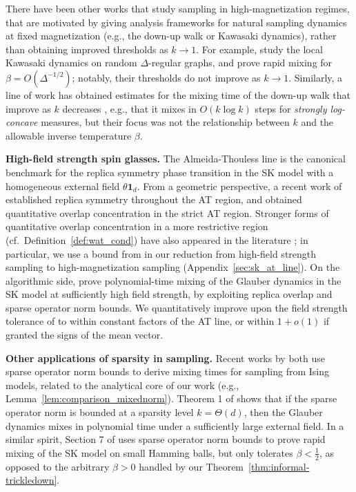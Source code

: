 \documentclass[11pt]{article}
\newcommand{\half}{\frac{1}{2}}
\newcommand{\1}{\mathbf{1}}
\newcommand{\0}{\mathbf{0}}
\begin{document}
There have been other works that study sampling in high-magnetization regimes, that are motivated by giving analysis frameworks for natural sampling dynamics at fixed magnetization (e.g., the down-up walk or Kawasaki dynamics), rather than obtaining improved thresholds as $k \to 1$. For example, \cite{BauerschmidtBodineauDagallier2024} study the local Kawasaki dynamics on random $\Delta$-regular graphs, and prove rapid mixing for $\beta = O(\Delta^{-1/2})$; notably, their thresholds do not improve as $k \to 1$. Similarly, a line of work has obtained estimates for the mixing time of the down-up walk that improve as $k$ decreases \cite{AnariLGV19, CryanGM19, AnariKV24}, e.g., that it mixes in $O(k\log k)$ steps for \emph{strongly log-concave} measures, but their focus was not the relationship between $k$ and the allowable inverse temperature $\beta$.

\textbf{High-field strength spin glasses.} The Almeida-Thouless line \cite{deAlmeidaThouless78} is the canonical benchmark for the replica symmetry phase transition in the SK model with a homogeneous external field $\theta\1_d$. From a geometric perspective, a recent work of \cite{Lopatto26} established replica symmetry throughout the AT region, and \cite{kusuoka2026quantitative} obtained quantitative overlap concentration in the strict AT region. Stronger forms of quantitative overlap concentration in a more restrictive region (cf.\ Definition~\ref{def:wat_cond}) have also appeared in the literature \cite{Talagrand11, JagannathTobasco17}; in particular, we use a bound from \cite{rajaraman2026markov} in our reduction from high-field strength sampling to high-magnetization sampling (Appendix~\ref{sec:sk_at_line}). On the algorithmic side, \cite{BandeiraElAlaouiRodder26} prove polynomial-time mixing of the Glauber dynamics in the SK model at sufficiently high field strength, by exploiting replica overlap and sparse operator norm bounds. We quantitatively improve upon the field strength tolerance of \cite{BandeiraElAlaouiRodder26} to within constant factors of the AT line, or within $1 + o(1)$ if granted the signs of the mean vector.

\textbf{Other applications of sparsity in sampling.} Recent works by \cite{BandeiraElAlaouiRodder26, DaviesLSS26} both use sparse operator norm bounds to derive mixing times for sampling from Ising models, related to the analytical core of our work (e.g., Lemma~\ref{lem:comparison_mixednorm}). Theorem 1 of \cite{BandeiraElAlaouiRodder26} shows that if the sparse operator norm is bounded at a sparsity level $k = \Theta(d)$, then the Glauber dynamics mixes in polynomial time under a sufficiently large external field. In a similar spirit, Section 7 of \cite{DaviesLSS26} uses sparse operator norm bounds to prove rapid mixing of the SK model on small Hamming balls, but only tolerates $\beta < \half$, as opposed to the arbitrary $\beta > 0$ handled by our Theorem~\ref{thm:informal-trickledown}.
\end{document}
